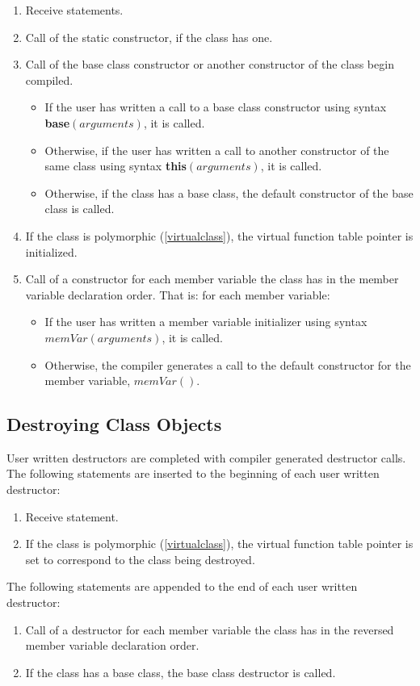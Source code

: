 \documentclass[a4paper,oneside,11pt]{book}
\theoremstyle{definition}
\begin{document}
\begin{enumerate}
\item
Receive statements.
\item
Call of the static constructor, if the class has one.
\item
Call of the base class constructor or another constructor of the class begin compiled.
\begin{itemize}
\item
If the user has written a call to a base class constructor using syntax \textbf{base}$(arguments)$, it is called.
\item
Otherwise, if the user has written a call to another constructor of the same class using syntax \textbf{this}$(arguments)$, it is called.
\item
Otherwise, if the class has a base class, the default constructor of the base class is called.
\end{itemize}
\item
If the class is polymorphic (\ref{virtualclass}), the virtual function table pointer is initialized.
\item
Call of a constructor for each member variable the class has in the member variable declaration order.
That is: for each member variable:
\begin{itemize}
\item
If the user has written a member variable initializer using syntax $memVar(arguments)$, it is called.
\item
Otherwise, the compiler generates a call to the default constructor for the member variable, $memVar()$.
\end{itemize}
\end{enumerate}

\subsection{Destroying Class Objects}

User written destructors are completed with compiler generated destructor calls.
The following statements are inserted to the beginning of each user written destructor:
\begin{enumerate}
\item
Receive statement.
\item
If the class is polymorphic (\ref{virtualclass}), the virtual function table pointer is set to correspond to the class being destroyed.
\end{enumerate}
The following statements are appended to the end of each user written destructor:
\begin{enumerate}
\item
Call of a destructor for each member variable the class has in the reversed member variable declaration order.
\item
If the class has a base class, the base class destructor is called.
\end{enumerate}
\end{document}
